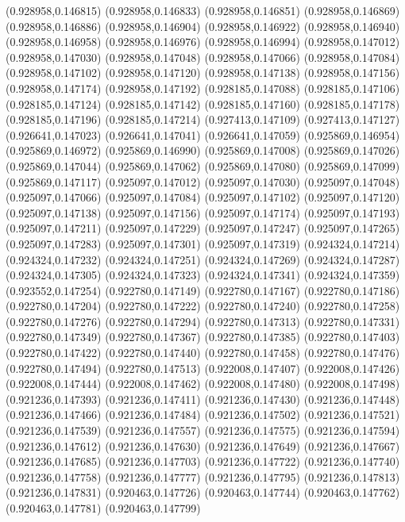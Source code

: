(0.928958,0.146815)
(0.928958,0.146833)
(0.928958,0.146851)
(0.928958,0.146869)
(0.928958,0.146886)
(0.928958,0.146904)
(0.928958,0.146922)
(0.928958,0.146940)
(0.928958,0.146958)
(0.928958,0.146976)
(0.928958,0.146994)
(0.928958,0.147012)
(0.928958,0.147030)
(0.928958,0.147048)
(0.928958,0.147066)
(0.928958,0.147084)
(0.928958,0.147102)
(0.928958,0.147120)
(0.928958,0.147138)
(0.928958,0.147156)
(0.928958,0.147174)
(0.928958,0.147192)
(0.928185,0.147088)
(0.928185,0.147106)
(0.928185,0.147124)
(0.928185,0.147142)
(0.928185,0.147160)
(0.928185,0.147178)
(0.928185,0.147196)
(0.928185,0.147214)
(0.927413,0.147109)
(0.927413,0.147127)
(0.926641,0.147023)
(0.926641,0.147041)
(0.926641,0.147059)
(0.925869,0.146954)
(0.925869,0.146972)
(0.925869,0.146990)
(0.925869,0.147008)
(0.925869,0.147026)
(0.925869,0.147044)
(0.925869,0.147062)
(0.925869,0.147080)
(0.925869,0.147099)
(0.925869,0.147117)
(0.925097,0.147012)
(0.925097,0.147030)
(0.925097,0.147048)
(0.925097,0.147066)
(0.925097,0.147084)
(0.925097,0.147102)
(0.925097,0.147120)
(0.925097,0.147138)
(0.925097,0.147156)
(0.925097,0.147174)
(0.925097,0.147193)
(0.925097,0.147211)
(0.925097,0.147229)
(0.925097,0.147247)
(0.925097,0.147265)
(0.925097,0.147283)
(0.925097,0.147301)
(0.925097,0.147319)
(0.924324,0.147214)
(0.924324,0.147232)
(0.924324,0.147251)
(0.924324,0.147269)
(0.924324,0.147287)
(0.924324,0.147305)
(0.924324,0.147323)
(0.924324,0.147341)
(0.924324,0.147359)
(0.923552,0.147254)
(0.922780,0.147149)
(0.922780,0.147167)
(0.922780,0.147186)
(0.922780,0.147204)
(0.922780,0.147222)
(0.922780,0.147240)
(0.922780,0.147258)
(0.922780,0.147276)
(0.922780,0.147294)
(0.922780,0.147313)
(0.922780,0.147331)
(0.922780,0.147349)
(0.922780,0.147367)
(0.922780,0.147385)
(0.922780,0.147403)
(0.922780,0.147422)
(0.922780,0.147440)
(0.922780,0.147458)
(0.922780,0.147476)
(0.922780,0.147494)
(0.922780,0.147513)
(0.922008,0.147407)
(0.922008,0.147426)
(0.922008,0.147444)
(0.922008,0.147462)
(0.922008,0.147480)
(0.922008,0.147498)
(0.921236,0.147393)
(0.921236,0.147411)
(0.921236,0.147430)
(0.921236,0.147448)
(0.921236,0.147466)
(0.921236,0.147484)
(0.921236,0.147502)
(0.921236,0.147521)
(0.921236,0.147539)
(0.921236,0.147557)
(0.921236,0.147575)
(0.921236,0.147594)
(0.921236,0.147612)
(0.921236,0.147630)
(0.921236,0.147649)
(0.921236,0.147667)
(0.921236,0.147685)
(0.921236,0.147703)
(0.921236,0.147722)
(0.921236,0.147740)
(0.921236,0.147758)
(0.921236,0.147777)
(0.921236,0.147795)
(0.921236,0.147813)
(0.921236,0.147831)
(0.920463,0.147726)
(0.920463,0.147744)
(0.920463,0.147762)
(0.920463,0.147781)
(0.920463,0.147799)

